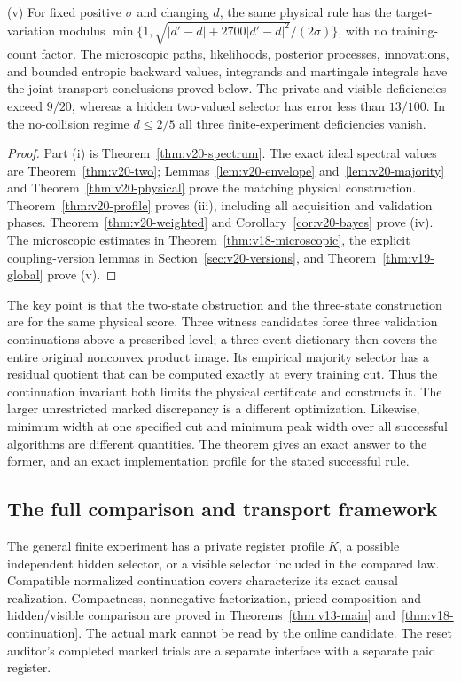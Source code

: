 \begin{theorem}
\smallskip\noindent
\textup{(v)} For fixed positive $\sigma$ and changing $d$, the same
physical rule has the target-variation modulus
$\min\{1,\sqrt{|d'-d|+2700|d'-d|^2}/(2\sigma)\}$, with no training-count
factor. The microscopic paths, likelihoods, posterior processes,
innovations, and bounded entropic backward values, integrands and
martingale integrals have the joint transport conclusions proved below.
The private and visible deficiencies exceed $9/20$, whereas a hidden
two-valued selector has error less than $13/100$. In the no-collision
regime $d\le2/5$ all three finite-experiment deficiencies vanish.
\end{theorem}
\begin{proof}
Part (i) is Theorem~\ref{thm:v20-spectrum}. The exact ideal spectral
values are Theorem~\ref{thm:v20-two}; Lemmas~\ref{lem:v20-envelope}
and~\ref{lem:v20-majority} and Theorem~\ref{thm:v20-physical} prove
the matching physical construction. Theorem~\ref{thm:v20-profile}
proves (iii), including all acquisition and validation phases.
Theorem~\ref{thm:v20-weighted} and Corollary~\ref{cor:v20-bayes}
prove (iv). The microscopic estimates in
Theorem~\ref{thm:v18-microscopic}, the explicit coupling-version lemmas
in Section~\ref{sec:v20-versions}, and
Theorem~\ref{thm:v19-global} prove (v).
\end{proof}

The key point is that the two-state obstruction and the three-state
construction are for the same physical score. Three witness candidates
force three validation continuations above a prescribed level; a
three-event dictionary then covers the entire original nonconvex product
image. Its empirical majority selector has a residual quotient that can
be computed exactly at every training cut. Thus the continuation invariant
both limits the physical certificate and constructs it. The larger
unrestricted marked discrepancy is a different optimization. Likewise,
minimum width at one specified cut and minimum peak width over all
successful algorithms are different quantities. The theorem gives an
exact answer to the former, and an exact implementation profile for the
stated successful rule.

\subsection{The full comparison and transport framework}
The general finite experiment has a private register profile $K$, a
possible independent hidden selector, or a visible selector included in
the compared law. Compatible normalized continuation covers characterize
its exact causal realization. Compactness, nonnegative factorization,
priced composition and hidden/visible comparison are proved in
Theorems~\ref{thm:v13-main} and~\ref{thm:v18-continuation}. The actual
mark cannot be read by the online candidate. The reset auditor's completed
marked trials are a separate interface with a separate paid register.

